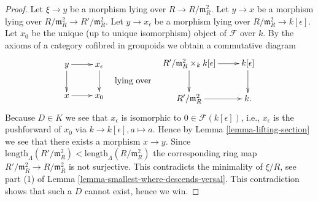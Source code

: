 \documentclass[10pt,a4paper]{amsart}
\theoremstyle{plain}
\theoremstyle{definition}
\theoremstyle{remark}
\numberwithin{equation}{subsection}
\begin{document}
\begin{proof}
\medskip\noindent
Let $\xi \to y$ be a morphism lying over $R \to R/\mathfrak m_R^2$.
Let $y \to x$ be a morphism lying over
$R/\mathfrak m_R^2 \to R'/\mathfrak m_R^2$.
Let $y \to x_\epsilon$ be a morphism lying over
$R/\mathfrak m_R^2 \to k[\epsilon]$. Let $x_0$ be the unique (up to unique
isomorphism) object of $\mathcal{F}$ over $k$.
By the axioms of a category cofibred in groupoids we obtain
a commutative diagram
$$
\vcenter{
\xymatrix{
y \ar[r] \ar[d] & x_\epsilon \ar[d] \\
x \ar[r]   & x_0
}
}
\quad\text{lying over}\quad
\vcenter{
\xymatrix{
R'/\mathfrak m_R^2 \times_k k[\epsilon] \ar[r] \ar[d] & k[\epsilon] \ar[d] \\
R'/\mathfrak m_R^2 \ar[r] & k.
}
}
$$
Because $D \in K$ we see that $x_\epsilon$ is isomorphic
to $0 \in \mathcal{F}(k[\epsilon])$, i.e., $x_\epsilon$ is
the pushforward of $x_0$ via $k \to k[\epsilon], a \mapsto a$.
Hence by
Lemma \ref{lemma-lifting-section}
we see that there exists a morphism $x \to y$. Since
$\text{length}_\Lambda(R'/\mathfrak m_R^2) <
\text{length}_\Lambda(R/\mathfrak m_R^2)$
the corresponding ring map $R'/\mathfrak m_R^2 \to R/\mathfrak m_R^2$
is not surjective. This contradicts the minimality of
$\xi/R$, see part (1) of
Lemma \ref{lemma-smallest-where-descends-versal}.
This contradiction shows that such a $D$ cannot exist, hence
we win.
\end{proof}
\end{document}
